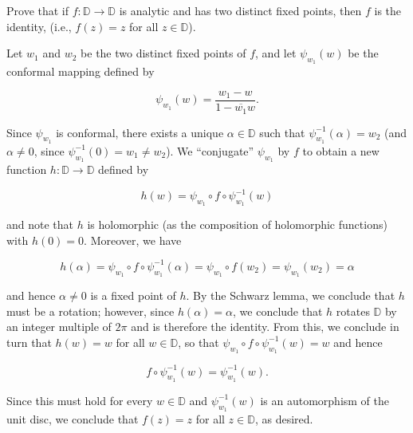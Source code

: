 Prove that if $f : \mathbb{D} \to \mathbb{D}$ is analytic and has two distinct fixed points, then $f$ is the identity,
(i.e., $f(z) = z$ for all $z \in \mathbb{D}$).

\begin{solution}
  Let $w_1$ and $w_2$ be the two distinct fixed points of $f$, and let $\psi_{w_1}(w)$ be the conformal mapping defined
  by

  $$
  \psi_{w_1}(w) = \frac{w_1 - w}{1 - \overline{w_1}w}.
  $$

  Since $\psi_{w_1}$ is conformal, there exists a unique $\alpha \in \mathbb{D}$ such that 
  $\psi_{w_1}^{-1}(\alpha) = w_2$ (and $\alpha \neq 0$, since $\psi_{w_1}^{-1}(0) = w_1 \neq w_2$). We ``conjugate''
  $\psi_{w_1}$ by $f$ to obtain a new function $h: \mathbb{D} \to \mathbb{D}$ defined by

  $$
  h(w) = \psi_{w_1} \circ f \circ \psi_{w_1}^{-1}(w)
  $$

  and note that $h$ is holomorphic (as the composition of holomorphic functions) with $h(0) = 0$. Moreover, we have

  $$
  h(\alpha) = \psi_{w_1} \circ f \circ \psi_{w_1}^{-1}(\alpha)
            = \psi_{w_1} \circ f(w_2) 
            = \psi_{w_1} (w_2)
            = \alpha
  $$

  and hence $\alpha \neq 0$ is a fixed point of $h$. By the Schwarz lemma, we conclude that $h$ must be a rotation;
  however, since $h(\alpha) = \alpha$, we conclude that $h$ rotates $\mathbb{D}$ by an integer multiple of $2 \pi$ and 
  is therefore the identity. From this, we conclude in turn that $h(w) = w$ for all $w \in \mathbb{D}$, so that 
  $\psi_{w_1} \circ f \circ \psi_{w_1}^{-1}(w) = w$ and hence

  $$
  f \circ \psi_{w_1}^{-1}(w) = \psi_{w_1}^{-1}(w).
  $$

  Since this must hold for every $w \in \mathbb{D}$ and $\psi_{w_1}^{-1}(w)$ is an automorphism of the unit disc, we 
  conclude that $f(z) = z$ for all $z \in \mathbb{D}$, as desired.
  \ \\
\end{solution}